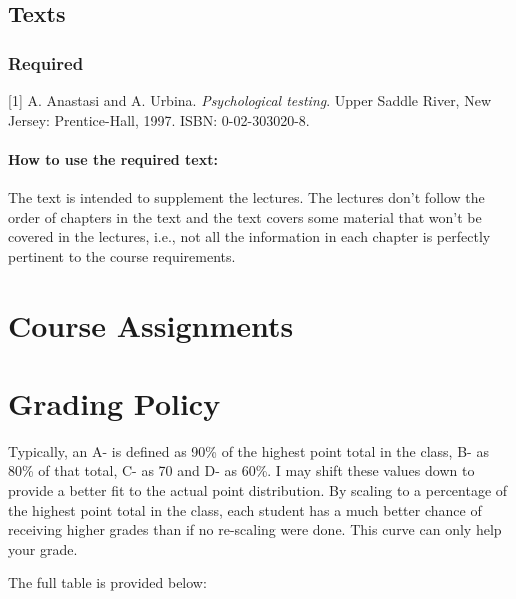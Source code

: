 \documentclass[
]{book}
\begin{document}
\hypertarget{texts}{%
\subsection{Texts}\label{texts}}

\hypertarget{required}{%
\subsubsection{Required}\label{required}}

{[}1{]} A. Anastasi and A. Urbina. \emph{Psychological testing}. Upper Saddle
River, New Jersey: Prentice-Hall, 1997. ISBN: 0-02-303020-8.

\hypertarget{how-to-use-the-required-text}{%
\paragraph{How to use the required text:}\label{how-to-use-the-required-text}}

The text \citep{anastasi1997} is intended to supplement the lectures. The lectures don't follow the order of chapters in the text and the text covers some material that won't be covered in the lectures, i.e., not all the information in each chapter is perfectly pertinent to the course requirements.

\hypertarget{course-assignments-1}{%
\section{Course Assignments}\label{course-assignments-1}}

\hypertarget{grading-policy-1}{%
\section{Grading Policy}\label{grading-policy-1}}

Typically, an A- is defined as 90\% of the highest point total in the class, B- as 80\% of that total, C- as 70 and D- as 60\%.
I may shift these values down to provide a better fit to the actual point distribution.
By scaling to a percentage of the highest point total in the class, each student has a much better chance of receiving higher grades than if no re-scaling were done.
This curve can only help your grade.

The full table is provided below:
\end{document}
